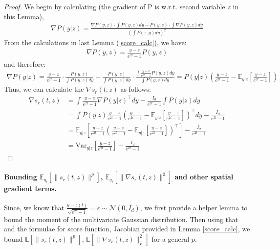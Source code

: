 \documentclass{article}
\begin{document}
\begin{proof}
    We begin by calculating ({the gradient of P is w.r.t. second variable $z$ in this Lemma}), 
\begin{align*}
    \nabla P(y|z) =  \frac{\nabla P(y,z) \cdot \int P(y,z)dy - P(y,z)\cdot \int \nabla P(y,z)dy}{\left(\int P (z,y) dy\right)^2}
\end{align*}
From the calculations in last Lemma (\ref{score_calc}), we have:
\begin{align*}
    \nabla P(y,z) = \frac{y-z}{e^{2t}-1}P(y,z)
\end{align*}
and therefore:
\begin{align*}
    \nabla P(y|z) =  \frac{y-z}{e^{2t}-1} \cdot \frac{P(y,z)}{\int P(y,z)dy} - \frac{P(y,z)}{\int P(y,z) dy}\cdot \frac{\int \frac{y-z}{e^{2t}-1}P(y,z)dy}{\int P(y,z)dy} = P(y|z) \left(\frac{y-z}{e^{2t}-1} - \mathbb{E}_{y|z}\left[\frac{y-z}{e^{2t}-1}\right]\right)
\end{align*}
Thus, we can calculate the $\nabla s_r(t,z)$ as follows:
\begin{align*}
    \nabla s_r(t,z) &= \int \frac{y-z}{e^{2t}-1} \nabla P(y|z)^\top dy - \frac{I_d}{e^{2t}-1}\int P(y|z)  dy \\
    &= \int P(y|z) \frac{y-z}{e^{2t}-1}\left(\frac{y-z}{e^{2t}-1} - \mathbb{E}_{y|z}\left[\frac{y-z}{e^{2t}-1}\right]\right)^\top dy - \frac{I_d}{e^{2t}-1}\\
    &= \mathbb{E}_{y|z} \left[\frac{y-z}{e^{2t}-1}\left(\frac{y-z}{e^{2t}-1} - \mathbb{E}_{y|z}\left[\frac{y-z}{e^{2t}-1}\right]\right)^\top \right] - \frac{I_d}{e^{2t}-1}\\
    &= \text{Var}_{y|z}\left[\frac{y-z}{e^{2t}-1}\right] - \frac{I_d}{e^{2t}-1}
\end{align*}
\end{proof}


\paragraph{Bounding $\mathbb{E}_{q_t}\left[\|s_r(t,z)\|^p\right]$, $\mathbb{E}_{q_t}\left[\|\nabla s_r(t,z)\|^2\right]$ and other spatial gradient terms.} Since, we know that $\frac{y-z(t)}{\sqrt{e^{2t}-1}}=\epsilon \sim \mathcal{N}(0,I_d)$, we first provide a helper lemma to bound the moment of the multivariate Gaussian distribution. Then using that and the formulae for score function, Jacobian provided in Lemma \ref{score_calc}, we bound $\mathbb{E}\left[\|s_r(t,z)\|^p\right]$, $\mathbb{E}\left[\|\nabla s_r(t,z)\|_F^2\right]$ for a general $p$.
\end{document}

